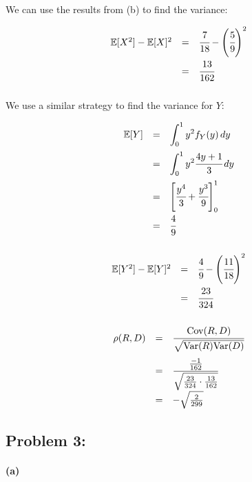 \documentclass[a4paper]{article}
\begin{document}
We can use the results from (b) to find the variance:

\begin{equation}
\begin{array}{rll}
\mathbb{E}[X^2] - \mathbb{E}[X]^2 & = & \cfrac{7}{18} - \left( \cfrac{5}{9} \right)^2 \\[.15in]
& = & \cfrac{13}{162} \\[.15in]
\end{array}
\end{equation}

We use a similar strategy to find the variance for $Y$:


\begin{equation}
\begin{array}{rll}
\mathbb{E}[Y] & = & \displaystyle\int^1_{0} y^2 f_Y(y) \,dy \\[.15in]
& = & \displaystyle\int^1_{0} y^2 \cfrac{4y+1}{3} \,dy \\[.15in]
& = & \left[ \cfrac{y^4}{3} + \cfrac{y^3}{9} \right]^1_0 \\[.15in]
& = & \cfrac{4}{9} \\[.15in]
\end{array}
\end{equation}

\begin{equation}
\begin{array}{rll}
\mathbb{E}[Y^2] - \mathbb{E}[Y]^2 & = & \cfrac{4}{9} - \left( \cfrac{11}{18} \right)^2 \\[.15in]
& = & \cfrac{23}{324} \\[.15in]
\end{array}
\end{equation}

\begin{equation}
\begin{array}{rll}
\rho(R,D) & = & \cfrac{\mbox{Cov}(R,D)}{\sqrt{\mbox{Var}(R)\mbox{Var}(D)}} \\[.2in]
& = & \cfrac{\frac{-1}{162}}{\sqrt{\frac{23}{324} \cdot \frac{13}{162}}} \\[.2in]
& = & -\sqrt{\frac{2}{299}}
\end{array}
\end{equation}

\subsection*{Problem 3:}

\paragraph{(a)}
\end{document}
